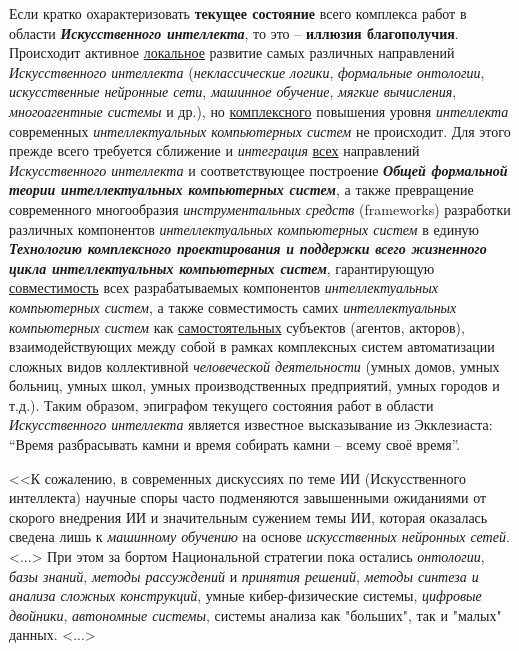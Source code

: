 Если кратко охарактеризовать \textbf{текущее состояние} всего комплекса работ в области \textbf{\textit{Искусственного интеллекта}}, то это -- \textbf{иллюзия благополучия}. Происходит активное \underline{локальное} развитие самых различных направлений \textit{Искусственного интеллекта} (\textit{неклассические логики}, \textit{формальные онтологии}, \textit{искусственные нейронные сети}, \textit{машинное обучение}, \textit{мягкие вычисления}, \textit{многоагентные системы} и др.), но \underline{комплексного} повышения уровня \textit{интеллекта} современных \textit{интеллектуальных компьютерных систем} не происходит. Для этого прежде всего требуется сближение и \textit{интеграция} \underline{всех} направлений \textit{Искусственного интеллекта} и соответствующее построение \textbf{\textit{Общей формальной теории интеллектуальных компьютерных систем}}, а также превращение современного многообразия \textit{инструментальных средств} (frameworks) разработки различных компонентов \textit{интеллектуальных компьютерных систем} в единую \textbf{\textit{Технологию комплексного проектирования и поддержки всего жизненного цикла интеллектуальных компьютерных систем}}, гарантирующую \underline{совместимость} всех разрабатываемых компонентов \textit{интеллектуальных компьютерных систем}, а также совместимость самих \textit{интеллектуальных компьютерных систем} как \underline{самостоятельных} субъектов (агентов, акторов), взаимодействующих между собой в рамках комплексных систем автоматизации сложных видов коллективной \textit{человеческой деятельности} (умных домов, умных больниц, умных школ, умных производственных предприятий, умных городов и т.д.). Таким образом, эпиграфом текущего состояния работ в области \textit{Искусственного интеллекта} является известное высказывание из Экклезиаста: ``Время разбрасывать камни и время собирать камни -- всему своё время''.

<<К сожалению, в современных дискуссиях по теме ИИ (Искусственного интеллекта) научные споры часто подменяются завышенными ожиданиями от скорого внедрения ИИ и значительным сужением темы ИИ, которая оказалась сведена лишь к \textit{машинному обучению} на основе \textit{искусственных нейронных сетей}. <...> При этом за бортом Национальной стратегии пока остались \textit{онтологии}, \textit{базы знаний}, \textit{методы рассуждений} и \textit{принятия решений}, \textit{методы синтеза и} \textit{анализа сложных конструкций}, умные кибер-физические системы, \textit{цифровые двойники}, \textit{автономные системы}, системы анализа как "больших"{}, так и "малых"{} данных. <...>

